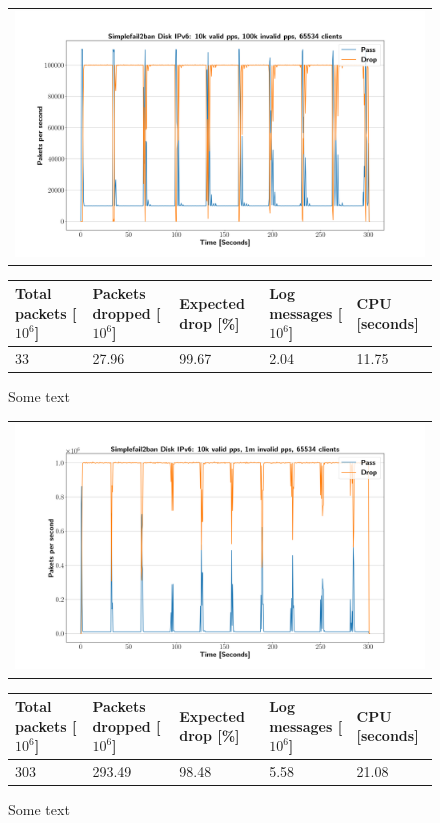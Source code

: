 \begin{figure}[p]
	\label{fig:simplefail2ban:disk:ip6:100k}
	\centering
	\scriptsize
	\begin{tabular}{c}
    	\centerline{\includegraphics[width=1.2\textwidth]{images/simplefail2ban_disk_ipv6_v10k_iv100k_c65534.png}}
	\end{tabular}
	\begin{tabular}{lllll}
		\toprule
		\textbf{Total packets [$10^6$]} & \textbf{Packets dropped [$10^6$]} & \textbf{Expected drop [\%]} & \textbf{Log messages [$10^6$]} & \textbf{CPU [seconds]} \\ \midrule 
		33 & 27.96 & 99.67 & 2.04 & 11.75 \\
		\bottomrule
	\end{tabular}
	\caption[Simplefail2ban Logfile IPv6 100k PPS]{Some text}
\end{figure}

\begin{figure}[p]
	\label{fig:simplefail2ban:disk:ip6:1m}
	\centering
	\scriptsize
	\begin{tabular}{c}
    	\centerline{\includegraphics[width=1.2\textwidth]{images/simplefail2ban_disk_ipv6_v10k_iv1m_c65534.png}}
	\end{tabular}
	\begin{tabular}{lllll}
		\toprule
		\textbf{Total packets [$10^6$]} & \textbf{Packets dropped [$10^6$]} & \textbf{Expected drop [\%]} & \textbf{Log messages [$10^6$]} & \textbf{CPU [seconds]} \\ \midrule 
		303 & 293.49 & 98.48 & 5.58 & 21.08 \\
		\bottomrule
	\end{tabular}
	\caption[Simplefail2ban Logfile IPv6 1m PPS]{Some text}
\end{figure}

